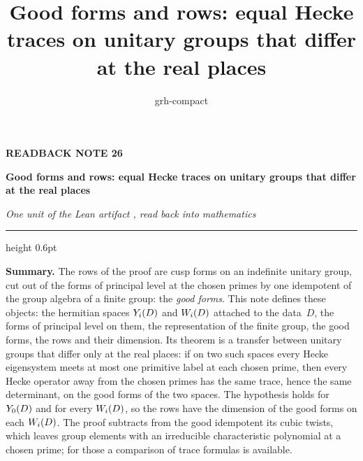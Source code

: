 \documentclass[11pt,a4paper]{article}
\title{Good forms and rows: equal Hecke traces on unitary groups that differ at the real places}
\author{grh-compact}
\date{}
\newcommand{\m}[1]{\mbox{$#1$}}        %
\theoremstyle{plainx}
\theoremstyle{uprightx}
\begin{document}
\color{ink}

{\raggedright
{\sffamily\bfseries\fontsize{7.2}{9}\selectfont\color{leancol}READBACK NOTE 26\par}
\vspace{5pt}
{\fontsize{21.5}{25.5}\selectfont\bfseries Good forms and rows: equal Hecke traces on unitary groups that differ at the real places\par}
\vspace{5pt}
{\fontsize{12.4}{16}\selectfont\itshape\color{inksoft} One unit of the Lean artifact \ArtifactName, read back into
mathematics\par}}
\vspace{8pt}
{\color{rulegrey}\hrule height 0.6pt}
\vspace{7pt}
\thispagestyle{empty}

\textbf{Summary.} The rows of the proof are cusp forms on an indefinite unitary group, cut out of the forms of
principal level at the chosen primes by one idempotent of the group algebra of a finite group: the \emph{good
forms}. This note defines these objects: the hermitian spaces \m{\spaceY{D}{i}} and \m{\spaceW{D}{i}} attached to the data~$D$, the forms of
principal level on them, the representation of the finite group, the good forms, the rows and their dimension.
Its theorem is a transfer between unitary groups that differ only at the real places: if on two such spaces every
Hecke eigensystem meets at most one primitive label at each chosen prime, then every Hecke operator away from
the chosen primes has the same trace, hence the same determinant, on the good forms of the two spaces. The
hypothesis holds for \m{\spaceY{D}{0}} and for every \m{\spaceW{D}{i}}, so the rows have the dimension of the good
forms on each \m{\spaceW{D}{i}}.
The proof subtracts from the good idempotent its cubic twists, which leaves group elements with an irreducible
characteristic polynomial at a chosen prime; for those a comparison of trace formulas is available.
\end{document}
